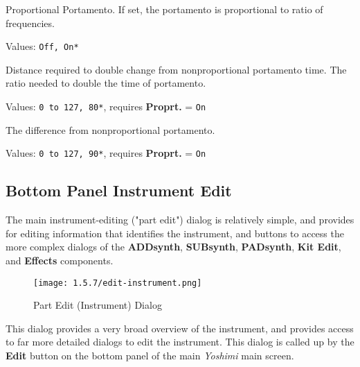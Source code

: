    Proportional Portamento.
   If set, the portamento is proportional to ratio of frequencies.

   Values: \texttt{Off, On*}

   Distance required to double change from nonproportional
   portamento time.
   The ratio needed to double the time of portamento.

   Values: \texttt{0 to 127, 80*}, requires \textbf{Proprt.} = \texttt{On}

   The difference from nonproportional portamento.

   Values: \texttt{0 to 127, 90*}, requires \textbf{Proprt.} = \texttt{On}

\subsection{Bottom Panel Instrument Edit}
\label{subsec:bottom_panel_instrument_edit}

   The main instrument-editing ("part edit")
   dialog is relatively simple, and provides for
   editing information that identifies the instrument, and buttons to access
   the more complex dialogs of the
   \textbf{ADDsynth}, \textbf{SUBsynth}, \textbf{PADsynth}, \textbf{Kit Edit},
   and \textbf{Effects} components.


\begin{figure}[H]
   \centering 
   \texttt{[image: 1.5.7/edit-instrument.png]}
   \caption{Part Edit (Instrument) Dialog}
   \label{fig:instrument_edit_dialog}
\end{figure}

   This dialog provides a very broad overview of the instrument, and
   provides access to far more detailed dialogs to edit the instrument.
   This dialog is called up by the \textbf{Edit} button on the bottom panel
   of the main \textsl{Yoshimi} main screen.

